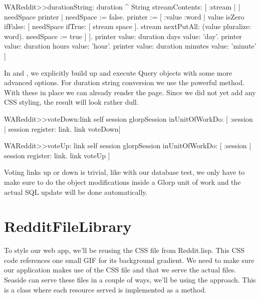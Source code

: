 \documentclass[a4paper,10pt,twoside]{book}
\begin{document}
\begin{code}{}
WAReddit>>durationString: duration
   ^ String streamContents: [ :stream | 
          | needSpace printer | 
          needSpace := false. 
          printer := [ :value :word |
                         value isZero ifFalse: [ 
                              needSpace ifTrue: [ stream space ]. 
                              stream nextPutAll: (value pluralize: word). 
                              needSpace := true ] ].
          printer value: duration days value: 'day'. 
          printer value: duration hours value: 'hour'. 
          printer value: duration minutes value: 'minute' ]
\end{code}

In  and , we explicitly build up and execute Query objects with some more advanced options. For duration string conversion we use the powerful  method. With these in place we can already render the page. Since we did not yet add any CSS styling, the result will look rather dull.

\begin{code}{}
WAReddit>>voteDown:link
    self session glorpSession
              inUnitOfWorkDo: [ :session | session register: link. 
                            link voteDown]
\end{code}



\begin{code}{}
WAReddit>>voteUp: link
   self session glorpSession 
      inUnitOfWorkDo: [ :session | session register: link.  link voteUp ]
\end{code}

Voting links up or down is trivial, like with our database test, we only have to make sure to do the object modifications inside a Glorp unit of work and the actual SQL update will be done automatically.

\section{RedditFileLibrary}

To style our web app, we'll be reusing the CSS file from Reddit.lisp. This CSS code references one small GIF for its background gradient. We need to make sure our application makes use of the CSS file and that we serve the actual files. Seaside can serve these files in a couple of ways, we'll be using the  approach. This is a class where each resource served is implemented as a method.
\end{document}
